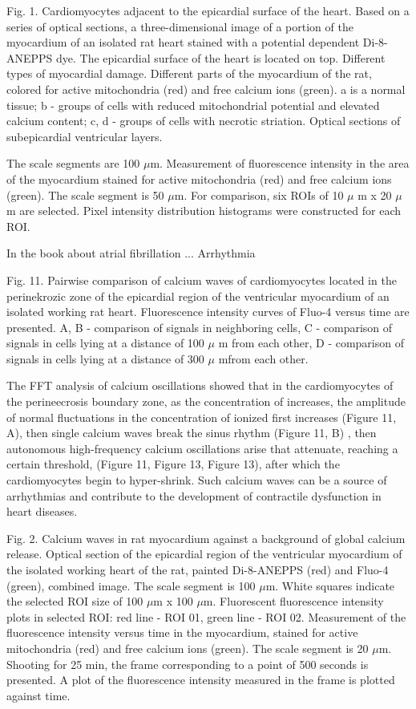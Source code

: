 \documentclass{biophys-new}
\begin{document}
Fig. 1. Cardiomyocytes adjacent to the epicardial surface of the heart.
Based on a series of optical sections, a three-dimensional image of a portion of the myocardium of an isolated rat heart stained with a potential dependent Di-8-ANEPPS dye.
The epicardial surface of the heart is located on top.
Different types of myocardial damage.
Different parts of the myocardium of the rat, colored for active mitochondria (red) and free calcium ions (green). a is a normal tissue; b - groups of cells with reduced mitochondrial potential and elevated calcium content; c, d - groups of cells with necrotic striation. Optical sections of subepicardial ventricular layers.


The scale segments are 100 $\mu$m.
Measurement of fluorescence intensity in the area of the myocardium stained for active mitochondria (red) and free calcium ions (green).
The scale segment is 50 $\mu$m.
For comparison, six ROIs of 10 $\mu$ m x 20 $\mu$ m are selected.
Pixel intensity distribution histograms were constructed for each ROI.


In the book \cite{kockskamper2002subcellular} about atrial fibrillation ...
Arrhythmia


Fig. 11. Pairwise comparison of calcium waves of cardiomyocytes located in the perinekrozic zone of the epicardial region of the ventricular myocardium of an isolated working rat heart. Fluorescence intensity curves of Fluo-4 versus time are presented. A, B - comparison of signals in neighboring cells, C - comparison of signals in cells lying at a distance of 100 $\mu$ m from each other, D - comparison of signals in cells lying at a distance of 300 $\mu$  mfrom each other.


The FFT analysis of calcium oscillations showed that in the cardiomyocytes of the perineecrosis boundary zone, as the concentration of  increases, the amplitude of normal fluctuations in the concentration of ionized  first increases (Figure 11, A), then single calcium waves break the sinus rhythm (Figure 11, B) , then autonomous high-frequency calcium oscillations arise that attenuate, reaching a certain threshold, (Figure 11, Figure 13, Figure 13), after which the cardiomyocytes begin to hyper-shrink. Such calcium waves can be a source of arrhythmias and contribute to the development of contractile dysfunction in heart diseases.


Fig. 2.  Calcium waves in rat myocardium against a background of global calcium release.
Optical section of the epicardial region of the ventricular myocardium of the isolated working heart of the rat, painted Di-8-ANEPPS (red) and Fluo-4 (green), combined image.
The scale segment is 100 $\mu$m.
White squares indicate the selected ROI size of 100 $\mu$m x 100 $\mu$m.
Fluorescent fluorescence intensity plots in selected ROI: red line - ROI 01, green line - ROI 02.
Measurement of the fluorescence intensity versus time in the myocardium, stained for active mitochondria (red) and free calcium ions (green).
The scale segment is 20 $\mu$m. Shooting for 25 min, the frame corresponding to a point of 500 seconds is presented.
A plot of the fluorescence intensity measured in the frame is plotted against time.
\end{document}
